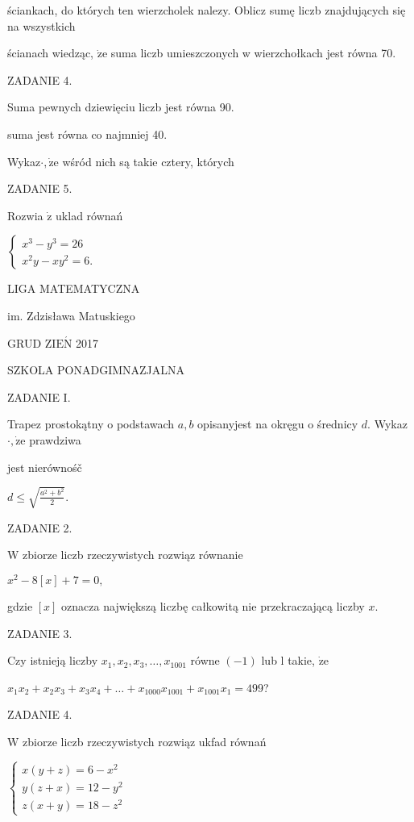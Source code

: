\documentclass[a4paper,12pt]{article}
\begin{document}
ściankach, do których ten wierzcholek nalezy. Oblicz sumę liczb znajdujących się na wszystkich

ścianach wiedząc, $\dot{\mathrm{z}}\mathrm{e}$ suma liczb umieszczonych w wierzchołkach jest równa 70.

ZADANIE 4.

Suma pewnych dziewięciu liczb jest równa 90.

suma jest równa co najmniej 40.

Wykaz$\cdot, \dot{\mathrm{z}}\mathrm{e}$ wśród nich są takie cztery, których

ZADANIE 5.

Rozwia $\dot{\mathrm{z}}$ uklad równań

$\left\{\begin{array}{l}
x^{3}-y^{3}=26\\
x^{2}y-xy^{2}=6.
\end{array}\right.$






LIGA MATEMATYCZNA

im. Zdzisława Matuskiego

GRUD Z$\mathrm{I}\mathrm{E}\acute{\mathrm{N}}$ 2017

SZKOLA PONADGIMNAZJALNA

ZADANIE I.

Trapez prostokątny o podstawach $a, b$ opisanyjest na okręgu o średnicy $d$. Wykaz$\cdot, \dot{\mathrm{z}}\mathrm{e}$ prawdziwa

jest nierównośč

$d\leq\sqrt{\frac{a^{2}+b^{2}}{2}}.$

ZADANIE 2.

$\mathrm{W}$ zbiorze liczb rzeczywistych rozwiąz równanie

$x^{2}-8[x]+7=0,$

gdzie $[x]$ oznacza największą liczbę całkowitą nie przekraczającą liczby $x.$

ZADANIE 3.

Czy istnieją liczby $x_{1}, x_{2}, x_{3}, \ldots, x_{1001}$ równe $(-1)$ lub l takie, $\dot{\mathrm{z}}\mathrm{e}$

$x_{1}x_{2}+x_{2}x_{3}+x_{3}x_{4}+\ldots+x_{1000}x_{1001}+x_{1001}x_{1}=499$?

ZADANIE 4.

$\mathrm{W}$ zbiorze liczb rzeczywistych rozwiąz ukfad równań

$\left\{\begin{array}{l}
x(y+z)=6-x^{2}\\
y(z+x)=12-y^{2}\\
z(x+y)=18-z^{2}
\end{array}\right.$
\end{document}
